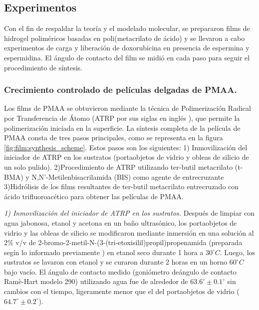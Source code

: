 \subsection{Experimentos}


Con el fin de respaldar la teor\'ia y el modelado molecular, se prepararon films de hidrogel polim\'ericos basadas en poli(metacrilato de \'acido) y se llevaron a cabo experimentos de carga y liberaci\'on de doxorubicina en presencia de espermina y espermidina. El \'angulo de contacto del film se midi\'o en cada paso para seguir el procedimiento de s\'intesis.



\subsubsection{Crecimiento controlado de pel\'iculas delgadas de PMAA.}

Los films  de PMAA se obtuvieron mediante la t\'ecnica de Polimerizaci\'on Radical por Transferencia de \'Atomo (ATRP por sus siglas en ingl\'es ), que permite la polimerizaci\'on iniciada en la superficie. La s\'intesis completa de la pel\'icula de PMAA consta de tres pasos principales, como se representa en la figura \ref{fig:film:synthesis_scheme}. Estos pasos son los siguientes:
1) Inmovilizaci\'on del iniciador de ATRP en los sustratos (portaobjetos de vidrio y obleas de silicio de un solo pulido).
2)Procedimiento de ATRP utilizando ter-butil metacrilato (t-BMA) y N,N'-Metilenbisacrilamida (BIS) como agente de entrecruzante
3)Hidr\'olisis de los films resultantes de ter-butil metacrilato entrecruzado con \'acido trifluoroac\'etico para obtener las pel\'iculas de PMAA.


\emph{1) Inmovilizaci\'on del iniciador de ATRP en los sustratos.}
 Despu\'es de limpiar con agua jabonosa, etanol y acetona en un ba\~no ultras\'onico, los portaobjetos de vidrio y las obleas de silicio se modificaron mediante inmersi\'on en una solución al 2\% v/v de 2-bromo-2-metil-N-(3-(tri-etoxisilil)propil)propenamida (preparada seg\'in lo informado previamente \addcite[Yameen2008]) en etanol seco durante 1 hora a $30^\circ C$. Luego, los sustratos se lavaron con etanol y se curaron durante 2 horas en un horno $60^\circ C$ bajo vac\'io. El \'angulo de contacto medido (goni\'ometro de\'angulo de contacto Ramè-Hart modelo 290) utilizando agua fue de alrededor de $63.6^\circ \pm 0.1^\circ$ sin cambios con el tiempo, ligeramente menor que el del portaobjetos de vidrio ($64.7^\circ \pm 0.2^\circ$).%




